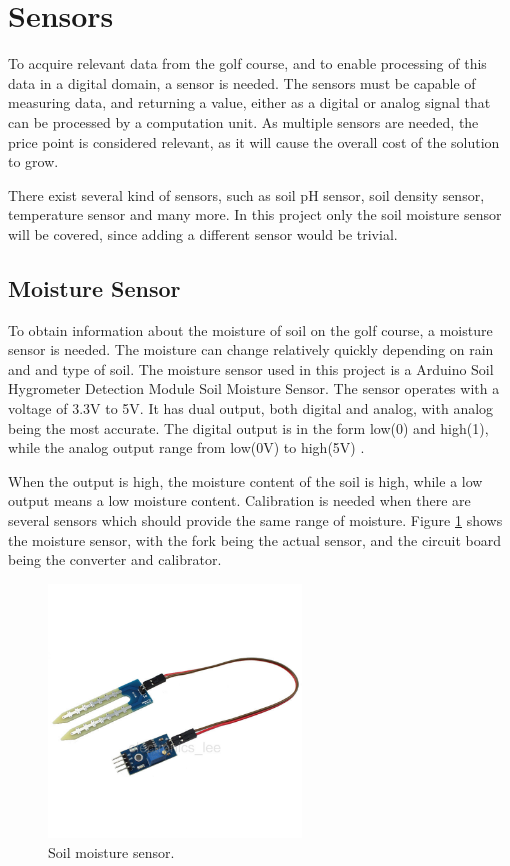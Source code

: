 \section{Sensors} \label{cha:sensorChapter}
To acquire relevant data from the golf course, and to enable processing of this data in a digital domain, a sensor is needed.
The sensors must be capable of measuring data, and returning a value, either as a digital or analog signal that can be processed by a computation unit.
As multiple sensors are needed, the price point is considered relevant, as it will cause the overall cost of the solution to grow.

There exist several kind of sensors, such as soil pH sensor, soil density sensor, temperature sensor and many more. In this project only the soil moisture sensor will be covered, since adding a different sensor would be trivial.

\subsection{Moisture Sensor}
To obtain information about the moisture of soil on the golf course, a moisture sensor is needed.
The moisture can change relatively quickly depending on rain and and type of soil.
The moisture sensor used in this project is a Arduino Soil Hygrometer Detection Module Soil Moisture Sensor.
The sensor operates with a voltage of 3.3V to 5V.
It has dual output, both digital and analog, with analog being the most accurate.
The digital output is in the form low(0) and high(1), while the analog output range from low(0V) to high(5V) \cite{moisture}.

When the output is high, the moisture content of the soil is high, while a low output means a low moisture content.
Calibration is needed when there are several sensors which should provide the same range of moisture.
Figure \ref{fig:moisture_figure} shows the moisture sensor, with the fork being the actual sensor, and the circuit board being the converter and calibrator. 

\begin{figure}[H]
\centering
\includegraphics[width=0.6\textwidth]{chapters/analysis/figs/soilMoistureSensor.jpg}
\caption{Soil moisture sensor.}
\label{fig:moisture_figure}
\end{figure}
